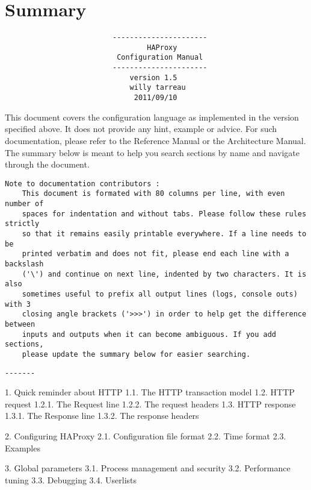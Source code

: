 
\chapter*{Summary}
\begin{verbatim}
                         ----------------------
                                 HAProxy
                          Configuration Manual
                         ----------------------
                             version 1.5
                             willy tarreau
                              2011/09/10
\end{verbatim}


This document covers the configuration language as implemented in the version
specified above. It does not provide any hint, example or advice. For such
documentation, please refer to the Reference Manual or the Architecture Manual.
The summary below is meant to help you search sections by name and navigate
through the document.

\begin{verbatim}
Note to documentation contributors :
    This document is formated with 80 columns per line, with even number of
    spaces for indentation and without tabs. Please follow these rules strictly
    so that it remains easily printable everywhere. If a line needs to be
    printed verbatim and does not fit, please end each line with a backslash
    ('\') and continue on next line, indented by two characters. It is also
    sometimes useful to prefix all output lines (logs, console outs) with 3
    closing angle brackets ('>>>') in order to help get the difference between
    inputs and outputs when it can become ambiguous. If you add sections,
    please update the summary below for easier searching.
\end{verbatim}

\begin{verbatim}
-------
\end{verbatim}


1.    Quick reminder about HTTP
1.1.      The HTTP transaction model
1.2.      HTTP request
1.2.1.        The Request line
1.2.2.        The request headers
1.3.      HTTP response
1.3.1.        The Response line
1.3.2.        The response headers


2.    Configuring HAProxy
2.1.      Configuration file format
2.2.      Time format
2.3.      Examples


3.    Global parameters
3.1.      Process management and security
3.2.      Performance tuning
3.3.      Debugging
3.4.      Userlists


